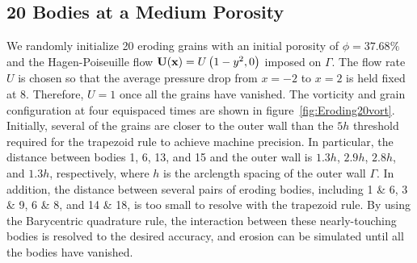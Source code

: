 \documentclass{jfm}
\begin{document}
\subsection{20 Bodies at a Medium Porosity}
\label{sec:Eroding20}
We randomly initialize 20 eroding grains with an initial porosity of
$\phi = 37.68\%$ and the Hagen-Poiseuille flow ${\mathbf{U}}({\mathbf{x}}) = U
\left(1-y^2,0 \right)$ imposed on $\Gamma$. The flow rate $U$ is chosen
so that the average pressure drop from $x=-2$ to $x=2$ is held fixed at
8. Therefore, $U=1$ once all the grains have vanished.  The vorticity
and grain configuration at four equispaced times are shown in
figure~\ref{fig:Eroding20vort}.  Initially, several of the grains are
closer to the outer wall than the $5h$ threshold required for the
trapezoid rule to achieve machine precision.  In particular, the
distance between bodies 1, 6, 13, and 15 and the outer wall is $1.3h$,
$2.9h$, $2.8h$, and $1.3h$, respectively, where $h$ is the arclength
spacing of the outer wall $\Gamma$.  In addition, the distance between
several pairs of eroding bodies, including 1 \& 6, 3 \& 9, 6 \& 8, and
14 \& 18, is too small to resolve with the trapezoid rule.  By using the
Barycentric quadrature rule, the interaction between these
nearly-touching bodies is resolved to the desired accuracy, and erosion
can be simulated until all the bodies have vanished.
\end{document}
